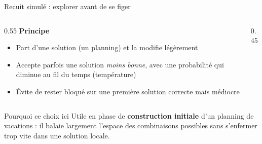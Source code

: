 \documentclass[aspectratio=169,11pt]{beamer}
\begin{document}
\begin{frame}{Recuit simulé : explorer avant de se figer}
  \begin{columns}
    \begin{column}{0.55\textwidth}
      \textbf{Principe}
      \begin{itemize}
        \item Part d'une solution (un planning) et la modifie légèrement
        \item Accepte parfois une solution \textit{moins bonne}, avec une
        probabilité qui diminue au fil du temps (température)
        \item Évite de rester bloqué sur une première solution correcte mais
        médiocre
      \end{itemize}
    \end{column}
    \begin{column}{0.45\textwidth}
      \centering
    \end{column}
  \end{columns}
  \begin{block}{Pourquoi ce choix ici}
    Utile en phase de \textbf{construction initiale} d'un planning de
    vacations : il balaie largement l'espace des combinaisons possibles sans
    s'enfermer trop vite dans une solution locale.
  \end{block}
\end{frame}
\end{document}
